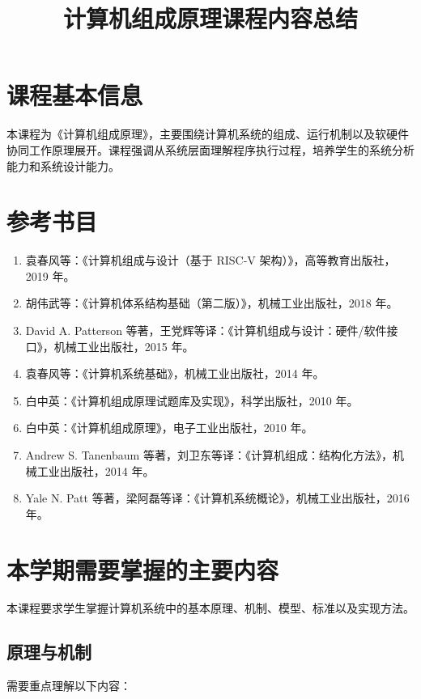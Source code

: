 \documentclass[12pt,a4paper]{ctexart}
\title{计算机组成原理课程内容总结}
\author{}
\date{}
\begin{document}
\maketitle

\section{课程基本信息}

本课程为《计算机组成原理》，主要围绕计算机系统的组成、运行机制以及软硬件协同工作原理展开。课程强调从系统层面理解程序执行过程，培养学生的系统分析能力和系统设计能力。

\section{参考书目}

\begin{enumerate}
    \item 袁春风等：《计算机组成与设计（基于 RISC-V 架构）》，高等教育出版社，2019 年。
    \item 胡伟武等：《计算机体系结构基础（第二版）》，机械工业出版社，2018 年。
    \item David A. Patterson 等著，王党辉等译：《计算机组成与设计：硬件/软件接口》，机械工业出版社，2015 年。
    \item 袁春风等：《计算机系统基础》，机械工业出版社，2014 年。
    \item 白中英：《计算机组成原理试题库及实现》，科学出版社，2010 年。
    \item 白中英：《计算机组成原理》，电子工业出版社，2010 年。
    \item Andrew S. Tanenbaum 等著，刘卫东等译：《计算机组成：结构化方法》，机械工业出版社，2014 年。
    \item Yale N. Patt 等著，梁阿磊等译：《计算机系统概论》，机械工业出版社，2016 年。
\end{enumerate}

\section{本学期需要掌握的主要内容}

本课程要求学生掌握计算机系统中的基本原理、机制、模型、标准以及实现方法。

\subsection{原理与机制}

需要重点理解以下内容：
\end{document}
